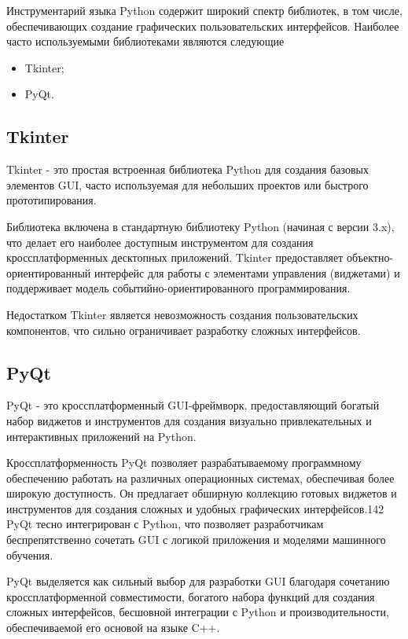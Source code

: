 Инструментарий языка Python содержит широкий спектр библиотек, в том числе, обеспечивающих создание графических пользовательских интерфейсов. 
Наиболее часто используемыми библиотеками являются следующие

\begin{itemize}
  \item Tkinter;
  \item PyQt.
\end{itemize}


\subsection{Tkinter}

Tkinter - это простая встроенная библиотека Python
для создания базовых элементов GUI, часто
используемая для небольших проектов или быстрого
прототипирования. 

Библиотека включена в стандартную библиотеку Python
(начиная с версии 3.x), что делает его наиболее
доступным инструментом для создания
кроссплатформенных десктопных приложений. Tkinter
предоставляет объектно-ориентированный интерфейс для
работы с элементами управления (виджетами) и
поддерживает модель событийно-ориентированного
программирования.

Недостатком Tkinter является невозможность создания пользовательских компонентов, что сильно ограничивает разработку сложных интерфейсов.

\subsection{PyQt}

PyQt - это кроссплатформенный GUI-фреймворк,
предоставляющий богатый набор виджетов и
инструментов для создания визуально привлекательных
и интерактивных приложений на Python.

Кроссплатформенность PyQt позволяет разрабатываемому
программному обеспечению работать на различных
операционных системах, обеспечивая более широкую
доступность. Он предлагает обширную коллекцию
готовых виджетов и инструментов для создания сложных
и удобных графических интерфейсов.142 PyQt тесно
интегрирован с Python, что позволяет разработчикам
беспрепятственно сочетать GUI с логикой приложения и
моделями машинного обучения.

PyQt выделяется как сильный выбор для разработки GUI благодаря сочетанию кроссплатформенной совместимости, богатого набора функций для создания сложных интерфейсов, бесшовной интеграции с Python и производительности, обеспечиваемой его основой на языке C++.

